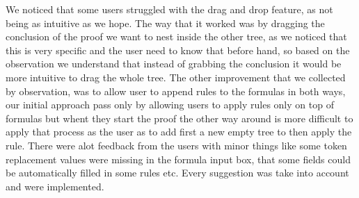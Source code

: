 We noticed that some users struggled with the drag and drop feature, as not being as intuitive as we hope. The way that it worked was by dragging the conclusion of the proof we want to nest inside the other tree, as we noticed that this is very specific and the user need to know that before hand, so based on the observation we understand that instead of grabbing the conclusion it would be more intuitive to drag the whole tree. The other improvement that we collected by observation, was to allow user to append rules to the formulas in both ways, our initial approach pass only by allowing users to apply rules only on top of formulas but whent they start the proof the other way around is more difficult to apply that process as the user as to add first a new empty tree to then apply the rule. There were alot feedback from the users with minor things like some  token replacement values were missing in the formula input box, that some fields could be automatically filled in some rules etc. Every suggestion was take into account and were implemented.

